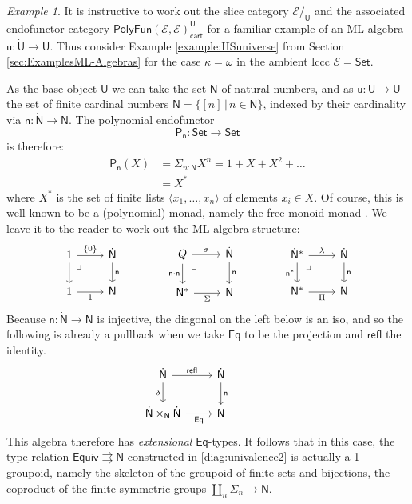 \documentclass[12pt,reqno]{amsart}
\newcommand{\N}{\ensuremath{\mathbb{N}}}
\newcommand{\EE}{\ensuremath{\mathcal{E}}}
\newcommand{\Set}{\ensuremath{\mathsf{Set}}}
\newcommand{\alg}[1]{\ensuremath{\mathsf{#1}}}
\renewcommand{\to}{\ensuremath{\rightarrow}}
\newcommand{\tto}{\ensuremath{\rightrightarrows}}
\newcommand{\refl}{\mathsf{refl}}
\renewcommand{\t}{\ensuremath{\mathsf{u}}}
\newcommand{\T}{\ensuremath{\mathsf{U}}}
\newcommand{\TT}{\ensuremath{\dot{\mathsf{U}}}}
\newcommand{\n}{\ensuremath{\mathsf{n}}}
\renewcommand{\N}{\ensuremath{\mathsf{N}}}
\newcommand{\NN}{\ensuremath{\dot{\mathsf{N}}}}
\newcommand{\pbcorner}{\arrow[dr,phantom,"\lrcorner" very near start, shift right=.5ex]} %
\theoremstyle{remark}
\newtheorem{example}[theorem]{Example}
\theoremstyle{definition}
\begin{document}
\begin{example}
It is instructive to work out the slice category $\EE/_\T$ and the associated endofunctor category $\mathsf{PolyFun}(\EE, \EE)_{\mathsf{cart}}^\T$ for a familiar example of an ML-algebra $\t:\TT\to\T$. Thus consider Example \ref{example:HSuniverse} from Section \ref{sec:ExamplesML-Algebras} for the case $\kappa = \omega$ in the ambient lccc $\EE = \Set$.  

As the base object $\T$ we can take the set $\N$ of natural numbers, and as $\t:\TT\to\T$ the set of finite cardinal numbers $\NN = \{ [n]\,|\, n\in\N\}$, indexed by their cardinality via $\n : \NN \to \N$.   The polynomial endofunctor $$\alg{P}_\n : \Set \to \Set$$ is therefore:
\begin{align*}
\alg{P}_\n(X) &= \Sigma_{n:\N}X^{n} = 1 + X + X^2 + \dots \\
& = X^*
\end{align*}
where $X^*$ is the set of finite lists $\langle x_1, \dots, x_n\rangle$ of elements $x_i \in X$.   Of course, this is well known to be a (polynomial) monad, namely the free monoid monad \cite[Example 1.9]{GambinoKoch:2013}.  We leave it to the reader to work out the ML-algebra structure:
\begin{equation*}\label{diag:MLalgN}
\begin{tikzcd}
	1 \ar[r,"\{0\}"] \ar[d] \pbcorner & \NN \ar[d, "\n"]\\  
	1 \ar[r, swap,"1"] & \N
 \end{tikzcd}\qquad\qquad
 \begin{tikzcd}
	Q  \ar[r,"\sigma"] \ar[d,swap,"{\n\cdot\n}"] \pbcorner &  \NN \ar[d, "\n"]\\  
	\N^* \ar[r,swap, "\Sigma"] & \N
\end{tikzcd} \qquad\qquad
	 \begin{tikzcd}
	\NN^* \ar[d,swap,"{\n^*}"] \ar[r,"\lambda"] \pbcorner &  \NN \ar[d, "\n"]\\  
	\N^* \ar[r,swap, "\Pi"] & \N
 \end{tikzcd} 
 \end{equation*}
Because $\n : \NN \to \N$ is injective, the diagonal on the left below is an iso, and so the following is already a pullback when we take $\mathsf{Eq}$ to be the projection and $\refl$ the identity.
 \begin{equation*}\label{diag:EqtypesN}
\begin{tikzcd}
	\NN \ar[r,"\refl"] \ar[d,swap,"\delta"] &  \NN \ar[d, "\n"]\\  
	\NN \times_\N \NN \ar[r, swap,"\mathsf{Eq}"] & \N
 \end{tikzcd}\qquad \qquad 
 \end{equation*}
This algebra therefore has \emph{extensional} $\mathsf{Eq}$-types. 
It follows that in this case, the type relation $\mathsf{Equiv} \tto \N$ constructed in \eqref{diag:univalence2} is actually a 1-groupoid, namely the skeleton of the groupoid of finite sets and bijections, the coproduct of the finite symmetric groups $\coprod_n\Sigma_n\to\N$. 


\end{example}
\end{document}

